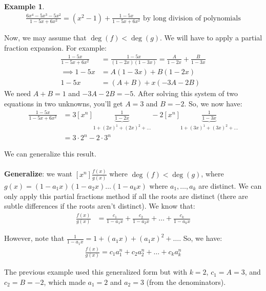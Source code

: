 \documentclass[]{article}
\theoremstyle{definition}
\newtheorem{ex}{Example}[section]
\begin{document}
		\begin{ex}
			\begin{align*}
				\frac{6x^4 - 5x^3 - 5x^2}{1 - 5x + 6x^2} = (x^2 - 1) + \frac{1 - 5x}{1 - 5x + 6x^2} \text{ by long division of polynomials}
			\end{align*}

			Now, we may assume that $\deg(f) < \deg(g)$. We will have to apply a partial fraction expansion. For example:
			\begin{align*}
				\frac{1 - 5x}{1 - 5x + 6x^2} &= \frac{1 - 5x}{(1 - 2x)(1 - 3x)} = \frac{A}{1 - 2x} + \frac{B}{1 - 3x} \\
				\implies 1 - 5x &= A(1 - 3x) + B(1 - 2x) \\
				1 - 5x &= (A + B) + x(-3A - 2B)
			\end{align*}
			We need $A + B = 1$ and $-3A -2B = -5$. After solving this system of two equations in two unknowns, you'll get $A = 3$ and $B = -2$. So, we now have:
			\begin{align*}
				\frac{1 - 5x}{1 - 5x + 6x^2} &= 3[x^n] \underbrace{\frac{1}{1 - 2x}}_{1 + (2x)^1 + (2x)^2 + \ldots} - 2 [x^n] \underbrace{\frac{1}{1 - 3x}}_{1 + (3x)^1 + (3x)^2 + \ldots} \\
				&= 3 \cdot 2^n - 2 \cdot 3^n
			\end{align*}
		\end{ex}

		We can generalize this result.
		\\ \\
		\textbf{Generalize}: we want $[x^n] \frac{f(x)}{g(x)}$ where $\deg(f) < \deg(g)$, where $g(x) = (1 - a_1 x)(1 - a_2 x) \ldots (1 - a_k x)$ where $a_1, \ldots, a_k$ are distinct. We can only apply this partial fractions method if all the roots are distinct (there are subtle differences if the roots aren't distinct). We know that:
		\begin{align*}
			\frac{f(x)}{g(x)} &= \frac{c_1}{1 - a_1 x} + \frac{c_2}{1 - a_2 x} + \ldots + \frac{c_k}{1 - a_k x}
		\end{align*}

		However, note that $\frac{1}{1 - a_1 x} = 1 + (a_1 x) + (a_1 x)^2 + \ldots$. So, we have:
		\begin{align*}
			[x^n] \frac{f(x)}{g(x)} = c_1 a_1^n + c_2 a_2^n + \ldots + c_k a_k^n
		\end{align*}

		The previous example used this generalized form but with $k = 2$, $c_1 = A = 3$, and $c_2 = B = -2$, which made $a_1 = 2$ and $a_2 = 3$ (from the denominators).
\end{document}
